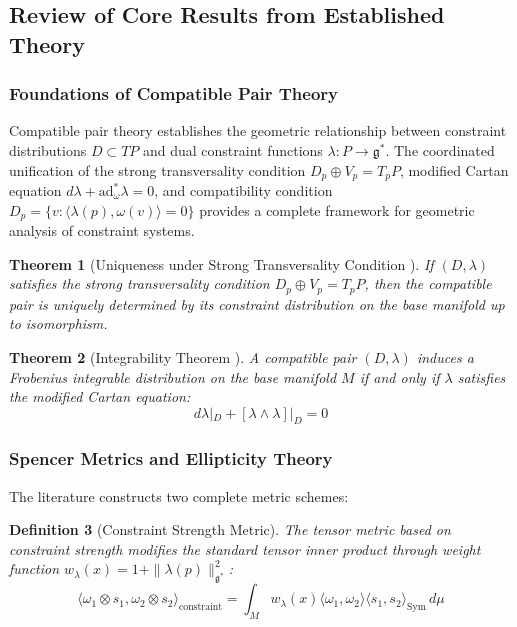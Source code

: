 \documentclass[a4paper,12pt]{extarticle}
\theoremstyle{plain}
\newtheorem{theorem}{Theorem}[section]
\newtheorem{definition}[theorem]{Definition}
\theoremstyle{definition}
\begin{document}
\subsection{Review of Core Results from Established Theory}

\subsubsection{Foundations of Compatible Pair Theory \cite{zheng2025dynamical}}

Compatible pair theory establishes the geometric relationship between constraint distributions $D \subset TP$ and dual constraint functions $\lambda: P \to \mathfrak{g}^*$. The coordinated unification of the strong transversality condition $D_p \oplus V_p = T_pP$, modified Cartan equation $d\lambda + \mathrm{ad}^*_\omega \lambda = 0$, and compatibility condition $D_p = \{v : \langle\lambda(p), \omega(v)\rangle = 0\}$ provides a complete framework for geometric analysis of constraint systems.

\begin{theorem}[Uniqueness under Strong Transversality Condition \cite{zheng2025dynamical}]
\label{thm:compatible-pair-uniqueness}
If $(D,\lambda)$ satisfies the strong transversality condition $D_p \oplus V_p = T_pP$, then the compatible pair is uniquely determined by its constraint distribution on the base manifold up to isomorphism.
\end{theorem}

\begin{theorem}[Integrability Theorem \cite{zheng2025dynamical}]
\label{thm:integrability}
A compatible pair $(D,\lambda)$ induces a Frobenius integrable distribution on the base manifold $M$ if and only if $\lambda$ satisfies the modified Cartan equation:
$$d\lambda|_D + [\lambda \wedge \lambda]|_D = 0$$
\end{theorem}

\subsubsection{Spencer Metrics and Ellipticity Theory \cite{zheng2025constructing}}

The literature \cite{zheng2025constructing} constructs two complete metric schemes:

\begin{definition}[Constraint Strength Metric]
\label{def:constraint-metric}
The tensor metric based on constraint strength modifies the standard tensor inner product through weight function $w_\lambda(x) = 1 + \|\lambda(p)\|^2_{\mathfrak{g}^*}$:
$$\langle\omega_1 \otimes s_1, \omega_2 \otimes s_2\rangle_{\mathrm{constraint}} = \int_M w_\lambda(x) \langle\omega_1, \omega_2\rangle \langle s_1, s_2\rangle_{\mathrm{Sym}} \, d\mu$$
\end{definition}
\end{document}
